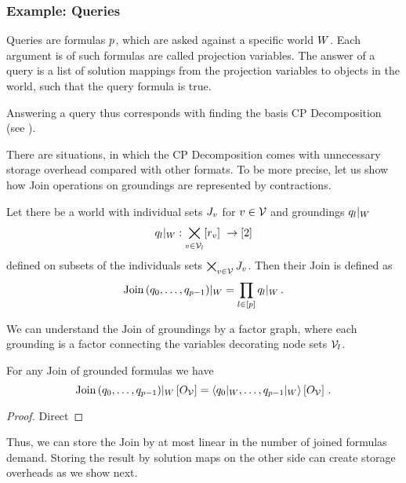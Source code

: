 \subsubsection{Example: Queries}

Queries are formulas $p$, which are asked against a specific world $W$.
Each argument is of such formulas are called projection variables.
The answer of a query is a list of solution mappings from the projection variables to objects in the world, such that the query formula is true.

Answering a query thus corresponds with finding the basis CP Decomposition (see ).

There are situations, in which the CP Decomposition comes with unnecessary storage overhead compared with other formats.
To be more precise, let us show how Join operations on groundings are represented by contractions.

\begin{definition}
	Let there be a world with individual sets $J_v$ for $v\in\mathcal{V}$ and groundings ${q_{l}}|_{W}$ 
		\[ \groundingof{\extformulaof{l}}: \bigtimes_{\node\in\nodes_l} [\inddimof{\node}] \rightarrow [2] \]
	defined on subsets of the individuals sets $\bigtimes_{v\in\mathcal{V}}J_v$.
	Then their $\mathrm{Join}$ is defined as
		\[ {\mathrm{Join}\left(q_{0},\ldots,q_{p-1} \right)}|_{W} = \prod_{l\in[p]} {q_{l}}|_{W} \, .\]
\end{definition}

We can understand the $\mathrm{Join}$ of groundings by a factor graph, where each grounding is a factor connecting the variables decorating node sets $\mathcal{V}_l$.


\begin{theorem}
	For any $\mathrm{Join}$ of grounded formulas we have
		\[ {\mathrm{Join}\left(q_{0},\ldots,q_{p-1} \right)}|_{W} \left[O_{\mathcal{V}}\right] = 
		\left\langle {q_{0}}|_{W},\ldots,{q_{p-1}}|_{W}\right\rangle \left[ O_{\mathcal{V}} \right] \, . \]
\end{theorem}
\begin{proof}
	Direct
\end{proof}

Thus, we can store the $\mathrm{Join}$ by at most linear in the number of joined formulas demand.
Storing the result by solution maps on the other side can create storage overheads as we show next.

